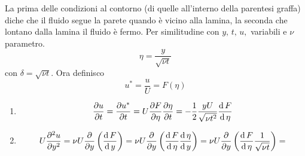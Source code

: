 La prima delle condizioni al contorno (di quelle all'interno della parentesi graffa) diche che il fluido segue la parete quando è vicino alla lamina, la seconda che lontano dalla lamina il fluido è fermo.
Per similitudine con $ y,\,t,\,u, $ variabili e $ \nu $ parametro.  
\[
  \eta= \frac{y}{\sqrt{\nu t}}
\]
con $ \delta = \sqrt{\nu t} $. Ora definisco 
\[
	u ^* = \frac{u }{U}= F \left( \eta \right) 
\]
\begin{enumerate}
  \item
	  \[
	  \frac{\partial u}{\partial t}= \frac{\partial u ^*}{\partial t} = U \frac{\partial F}{\partial\eta}\frac{\partial\eta}{\partial t}= -\frac{1}{2}\frac{y U}{\sqrt{\nu t ^2}}\frac{\operatorname{d} F}{\operatorname{d} \eta} 
	  \]
  \item 
	  \[
		  U \frac{\partial^2u}{\partial y^2} = \nu U \frac{\partial}{\partial y}\left( \frac{\operatorname{d} F}{\operatorname{d} y} \right) = \nu U \frac{\partial}{\partial y}\left( \frac{\operatorname{d} F}{\operatorname{d} \eta}\frac{\operatorname{d} \eta}{\operatorname{d} y} \right) = \nu U \frac{\partial}{\partial y}\left( \frac{\operatorname{d} F}{\operatorname{d} \eta}\frac{1}{\sqrt{\nu t}} \right) = 
	  \]
\end{enumerate}




